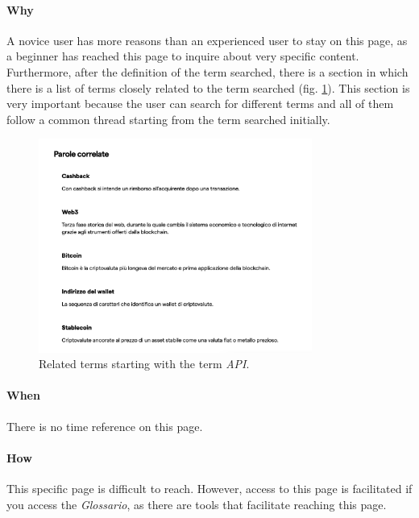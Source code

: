 \paragraph{Why}

A novice user has more reasons than an experienced user to stay on this 
page, as a beginner has reached this page to inquire about very specific 
content. Furthermore, after the definition of the term searched, there is 
a section in which there is a list of terms closely related to the term 
searched (fig. \ref{fig:glossary-5}). This section is very important 
because the user can search for different terms and all of them follow a 
common thread starting from the term searched initially. 

\begin{figure}[H]
  \centering
  \includegraphics[width=0.80\textwidth]{res/images/internal-pages/glossary/glossary-5.png}
  \caption{Related terms starting with the term \textit{API}.}
  \label{fig:glossary-5}
\end{figure}

\paragraph{When}

There is no time reference on this page.

\paragraph{How}

This specific page is difficult to reach. However, access to this page is 
facilitated if you access the \textit{Glossario}, as there are tools that 
facilitate reaching this page.

